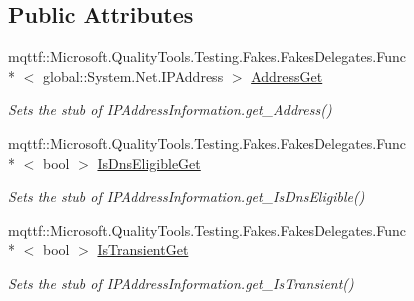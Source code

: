 \subsection*{Public Attributes}
\begin{DoxyCompactItemize}
\item 
mqttf\-::\-Microsoft.\-Quality\-Tools.\-Testing.\-Fakes.\-Fakes\-Delegates.\-Func\\*
$<$ global\-::\-System.\-Net.\-I\-P\-Address $>$ \hyperlink{class_system_1_1_net_1_1_network_information_1_1_fakes_1_1_stub_i_p_address_information_a0b0ac3cec5a182719ee35a68e1174ec3}{Address\-Get}
\begin{DoxyCompactList}\small\item\em Sets the stub of I\-P\-Address\-Information.\-get\-\_\-\-Address()\end{DoxyCompactList}\item 
mqttf\-::\-Microsoft.\-Quality\-Tools.\-Testing.\-Fakes.\-Fakes\-Delegates.\-Func\\*
$<$ bool $>$ \hyperlink{class_system_1_1_net_1_1_network_information_1_1_fakes_1_1_stub_i_p_address_information_a0461922c5832174b1265ab462cb5c621}{Is\-Dns\-Eligible\-Get}
\begin{DoxyCompactList}\small\item\em Sets the stub of I\-P\-Address\-Information.\-get\-\_\-\-Is\-Dns\-Eligible()\end{DoxyCompactList}\item 
mqttf\-::\-Microsoft.\-Quality\-Tools.\-Testing.\-Fakes.\-Fakes\-Delegates.\-Func\\*
$<$ bool $>$ \hyperlink{class_system_1_1_net_1_1_network_information_1_1_fakes_1_1_stub_i_p_address_information_a798738af3bd2f4a61662efe01073a1f0}{Is\-Transient\-Get}
\begin{DoxyCompactList}\small\item\em Sets the stub of I\-P\-Address\-Information.\-get\-\_\-\-Is\-Transient()\end{DoxyCompactList}\end{DoxyCompactItemize}
